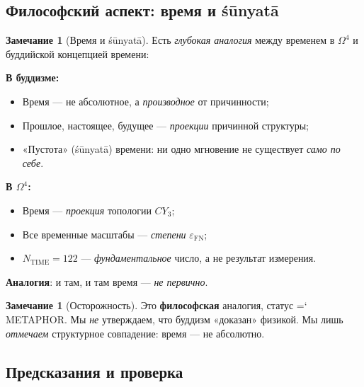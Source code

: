 \documentclass[11pt,a4paper]{article}
\newcommand{\CY}{CY_3}
\newcommand{\Om}{\Omega^4}
\newcommand{\epsFN}{\varepsilon_{\text{FN}}}
\newcommand{\shunyata}{\'s\=unyat\=a}
\renewcommand{\texttt}[1]{{\ttfamily\hyphenchar\font=`\- #1}}
\theoremstyle{definition}
\newtheorem{remark}[theorem]{Замечание}
\begin{document}
\subsection{Философский аспект: время и śūnyatā}
\label{subsec:time-philosophy}

\begin{remark}[Время и śūnyatā]
\label{rem:time-shunyata}
Есть \emph{глубокая аналогия} между временем в $\Om$ и буддийской 
концепцией времени:

\medskip\noindent
\textbf{В буддизме:}
\begin{itemize}
    \item Время — не абсолютное, а \emph{производное} от 
          причинности;
    \item Прошлое, настоящее, будущее — \emph{проекции} 
          причинной структуры;
    \item «Пустота» (\shunyata) времени: ни одно мгновение 
          не существует \emph{само по себе}.
\end{itemize}

\medskip\noindent
\textbf{В $\Om$:}
\begin{itemize}
    \item Время — \emph{проекция} топологии $\CY$;
    \item Все временные масштабы — \emph{степени} $\epsFN$;
    \item $N_{\text{TIME}} = 122$ — \emph{фундаментальное} число, 
          а не результат измерения.
\end{itemize}

\medskip\noindent
\textbf{Аналогия}: и там, и там время — \emph{не первично}.
\end{remark}

\begin{remark}[Осторожность]
\label{rem:time-caution}
Это \textbf{философская} аналогия, статус \texttt{METAPHOR}. Мы 
\emph{не} утверждаем, что буддизм «доказан» физикой. Мы лишь 
\emph{отмечаем} структурное совпадение: время — не абсолютно.
\end{remark}

\subsection{Предсказания и проверка}
\label{subsec:time-predictions}
\end{document}
